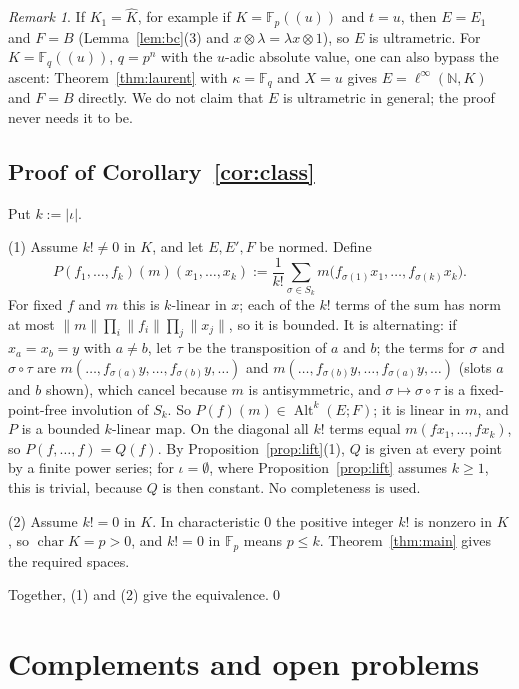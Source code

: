 \documentclass[11pt]{amsart}
\theoremstyle{definition}
\theoremstyle{remark}
\newtheorem{remark}[theorem]{Remark}
\numberwithin{equation}{section}
\newcommand{\linf}{\ell^\infty}
\newcommand{\N}{\mathbb{N}}
\newcommand{\F}{\mathbb{F}}
\newcommand{\Alt}{\operatorname{Alt}}
\newcommand{\Kh}{\widehat K}
\newcommand{\abs}[1]{\lvert #1\rvert}
\newcommand{\norm}[1]{\lVert #1\rVert}
\begin{document}
\begin{remark}\label{rem:spaces}
If $K_1=\Kh$, for example if $K=\F_p((u))$ and $t=u$, then $E=E_1$ and $F=B$ (Lemma~\ref{lem:bc}(3) and $x\otimes\lambda=\lambda
x\otimes1$), so $E$ is ultrametric. For $K=\F_q((u))$, $q=p^n$ with the $u$\nobreakdash-adic absolute value, one can also bypass the
ascent: Theorem~\ref{thm:laurent} with $\kappa=\F_q$ and $X=u$ gives $E=\linf(\N,K)$ and $F=B$ directly. We do not claim
that $E$ is ultrametric in general; the proof never needs it to be.
\end{remark}

\subsection{Proof of Corollary~\ref{cor:class}}
Put $k:=\abs\iota$.

(1) Assume $k!\ne0$ in $K$, and let $E,E',F$ be normed. Define
\[
P(f_1,\dots,f_k)(m)(x_1,\dots,x_k):=\frac1{k!}\sum_{\sigma\in S_k}m\bigl(f_{\sigma(1)}x_1,\dots,f_{\sigma(k)}x_k\bigr).
\]
For fixed $f$ and $m$ this is $k$\nobreakdash-linear in $x$; each of the $k!$ terms of the sum has norm at most
$\norm m\prod_i\norm{f_i}\prod_j\norm{x_j}$, so it is bounded.
It is alternating: if $x_a=x_b=y$ with $a\ne b$, let $\tau$ be the transposition of $a$ and $b$; the terms for $\sigma$ and
$\sigma\circ\tau$ are $m(\dots,f_{\sigma(a)}y,\dots,f_{\sigma(b)}y,\dots)$ and $m(\dots,f_{\sigma(b)}y,\dots,f_{\sigma(a)}y,\dots)$
(slots $a$ and $b$ shown), which cancel because $m$ is antisymmetric, and $\sigma\mapsto\sigma\circ\tau$ is a
fixed-point-free involution of $S_k$. So $P(f)(m)\in\Alt^k(E;F)$; it is linear in $m$, and $P$ is a bounded $k$\nobreakdash-linear
map. On the diagonal all $k!$ terms equal $m(fx_1,\dots,fx_k)$, so $P(f,\dots,f)=Q(f)$. By
Proposition~\ref{prop:lift}(1), $Q$ is given at every point by a finite power series; for $\iota=\emptyset$, where
Proposition~\ref{prop:lift} assumes $k\ge1$, this is trivial, because $Q$ is then constant. No completeness is used.

(2) Assume $k!=0$ in $K$. In characteristic $0$ the positive integer $k!$ is nonzero in $K$, so $\operatorname{char}K=p>0$,
and $k!=0$ in $\F_p$ means $p\le k$. Theorem~\ref{thm:main} gives the required spaces.

Together, (1) and (2) give the equivalence.\qed

\section{Complements and open problems}\label{sec:complements}
\end{document}
